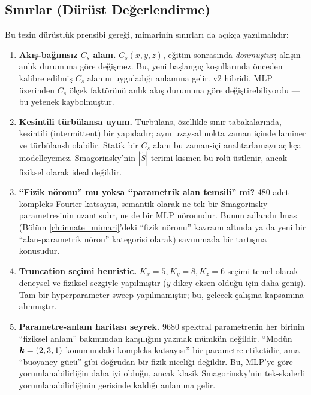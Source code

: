 \subsection{Sınırlar (Dürüst Değerlendirme)}

Bu tezin dürüstlük prensibi gereği, mimarinin sınırları da açıkça
yazılmalıdır:

\begin{enumerate}
  \item \textbf{Akış-bağımsız $C_s$ alanı.} $C_s(x,y,z)$, eğitim
        sonrasında \emph{donmuştur}; akışın anlık durumuna göre
        değişmez. Bu, yeni başlangıç koşullarında önceden
        kalibre edilmiş $C_s$ alanını uyguladığı anlamına gelir.
        v2 hibridi, MLP üzerinden $C_s$ ölçek faktörünü anlık
        akış durumuna göre değiştirebiliyordu — bu yetenek kaybolmuştur.
  \item \textbf{Kesintili türbülansa uyum.} Türbülans, özellikle
        sınır tabakalarında, kesintili (intermittent) bir yapıdadır;
        aynı uzaysal nokta zaman içinde laminer ve türbülanslı
        olabilir. Statik bir $C_s$ alanı bu zaman-içi anahtarlamayı
        açıkça modelleyemez. Smagorinsky'nin $|\widetilde{S}|$ terimi
        kısmen bu rolü üstlenir, ancak fiziksel olarak ideal değildir.
  \item \textbf{``Fizik nöronu'' mu yoksa ``parametrik alan
        temsili'' mi?} 480 adet kompleks Fourier katsayısı, semantik
        olarak ne tek bir Smagorinsky parametresinin uzantısıdır,
        ne de bir MLP nöronudur. Bunun adlandırılması (Bölüm
        \ref{ch:innate_mimari}'deki ``fizik nöronu'' kavramı altında
        ya da yeni bir ``alan-parametrik nöron'' kategorisi olarak)
        savunmada bir tartışma konusudur.
  \item \textbf{Truncation seçimi heuristic.} $K_x=5,K_y=8,K_z=6$
        seçimi temel olarak deneysel ve fiziksel sezgiyle
        yapılmıştır ($y$ dikey eksen olduğu için daha geniş).
        Tam bir hyperparameter sweep yapılmamıştır;
        bu, gelecek çalışma kapsamına alınmıştır.
  \item \textbf{Parametre-anlam haritası seyrek.} 9680 spektral
        parametrenin her birinin ``fiziksel anlam'' bakımından
        karşılığını yazmak mümkün değildir. ``Modün $\bm{k}=(2,3,1)$
        konumundaki kompleks katsayısı'' bir parametre etiketidir, ama
        ``buoyancy gücü'' gibi doğrudan bir fizik niceliği değildir.
        Bu, MLP'ye göre yorumlanabilirliğin daha iyi olduğu, ancak
        klasik Smagorinsky'nin tek-skalerli yorumlanabilirliğinin
        gerisinde kaldığı anlamına gelir.
\end{enumerate}

